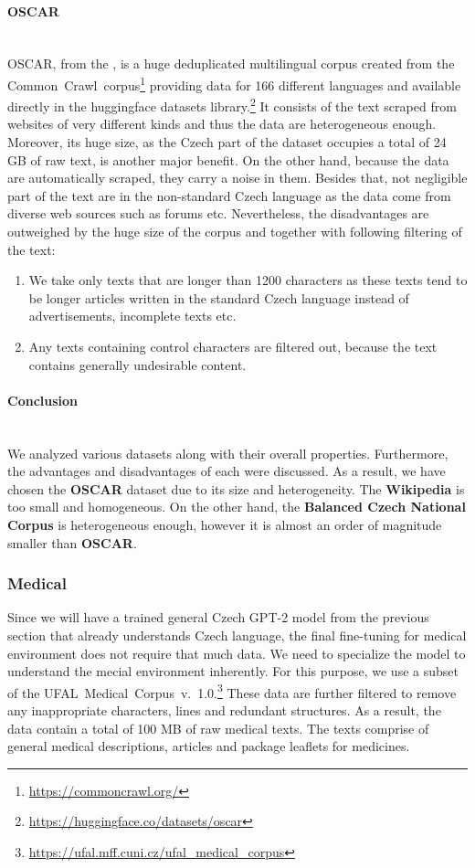 \paragraph*{OSCAR} ~\\
\indent OSCAR, from the \citet{ortiz-suarez-etal-2020-monolingual}, is a huge deduplicated multilingual corpus created from the Common~Crawl~corpus\footnote[5]{\url{https://commoncrawl.org/}} providing data for 166 different languages and available directly in the huggingface datasets library.\footnote[6]{\url{https://huggingface.co/datasets/oscar}} It consists of the text scraped from websites of very different kinds and thus the data are heterogeneous enough. Moreover, its huge size, as the Czech part of the dataset occupies a total of 24 GB of raw text, is another major benefit. On the other hand, because the data are automatically scraped, they carry a noise in them. Besides that, not negligible part of the text are in the non-standard Czech language as the data come from diverse web sources such as forums etc. Nevertheless, the disadvantages are outweighed by the huge size of the corpus and together with following filtering of the text:
\begin{enumerate}
	\item We take only texts that are longer than 1200 characters as these texts tend to be longer articles written in the standard Czech language instead of advertisements, incomplete texts etc.
	\item Any texts containing control characters are filtered out, because the text contains generally undesirable content.
\end{enumerate}

\paragraph*{Conclusion} ~\\
\indent We analyzed various datasets along with their overall properties. Furthermore, the advantages and disadvantages of each were discussed. As a result, we have chosen the \textbf{OSCAR} dataset due to its size and heterogeneity. The \textbf{Wikipedia} is too small and homogeneous. On the other hand, the \textbf{Balanced Czech National Corpus} is heterogeneous enough, however it is almost an order of magnitude smaller than \textbf{OSCAR}.

\subsubsection{Medical}
Since we will have a trained general Czech GPT-2 model from the previous section that already understands Czech language, the final fine-tuning for medical environment does not require that much data. We need to specialize the model to understand the mecial environment inherently. For this purpose, we use a subset of the UFAL~Medical~Corpus~v.\ 1.0.\footnote[7]{\url{https://ufal.mff.cuni.cz/ufal\_medical\_corpus}} These data are further filtered to remove any inappropriate characters, lines and redundant structures. As a result, the data contain a total of 100 MB of raw medical texts. The texts comprise of general medical descriptions, articles and package leaflets for medicines.

